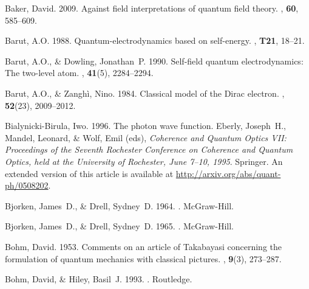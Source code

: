 \documentclass[12pt,secnumarabic,amsmath,amssymb,balancelastpage,nofootinbib]{article}
\begin{document}
\begin{thebibliography}{}

Baker, David. 2009.
\newblock Against field interpretations of quantum field theory.
, {\bf 60},
  585--609.

Barut, A.O. 1988.
\newblock Quantum-electrodynamics based on self-energy.
, {\bf T21}, 18--21.

Barut, A.O., \& Dowling, Jonathan~P. 1990.
\newblock Self-field quantum electrodynamics: The two-level atom.
, {\bf 41}(5), 2284--2294.

Barut, A.O., \& Zangh\`{i}, Nino. 1984.
\newblock Classical model of the Dirac electron.
, {\bf 52}(23), 2009--2012.

Bialynicki-Birula, Iwo. 1996.
\newblock The photon wave function.
 Eberly, Joseph~H., Mandel, Leonard, \&
  Wolf, Emil (eds), {\em Coherence and Quantum Optics VII: Proceedings of the
  Seventh Rochester Conference on Coherence and Quantum Optics, held at the
  University of Rochester, June 7--10, 1995}.
\newblock Springer.
\newblock An extended version of this article is available at
  \url{http://arxiv.org/abs/quant-ph/0508202}.

Bjorken, James~D., \& Drell, Sydney~D. 1964.
.
\newblock McGraw-Hill.

Bjorken, James~D., \& Drell, Sydney~D. 1965.
.
\newblock McGraw-Hill.

Bohm, David. 1953.
\newblock Comments on an article of Takabayasi concerning the formulation of
  quantum mechanics with classical pictures.
, {\bf 9}(3), 273--287.

Bohm, David, \& Hiley, Basil~J. 1993.
.
\newblock Routledge.


\end{thebibliography}
\end{document}
